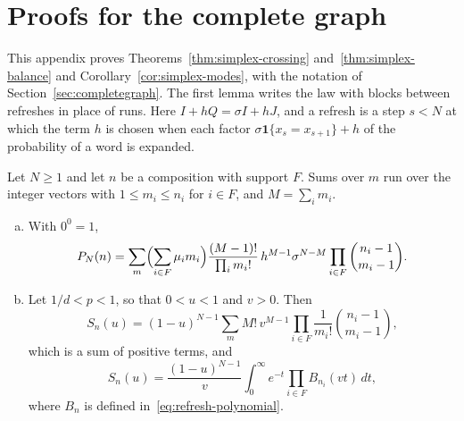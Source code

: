 \section{Proofs for the complete graph}\label{app:complete}

This appendix proves Theorems~\ref{thm:simplex-crossing} and~\ref{thm:simplex-balance} and
Corollary~\ref{cor:simplex-modes}, with the notation of Section~\ref{sec:completegraph}. The
first lemma writes the law with blocks between refreshes in place of runs. Here
$I+hQ=\sigma I+hJ$, and a refresh is a step $s<N$ at which the term $h$ is chosen when each factor
$\sigma\mathbf 1\{x_s=x_{s+1}\}+h$ of the probability of a word is expanded.

\begin{lemma}\label{lem:refresh}
Let $N\ge1$ and let $n$ be a composition with support $F$. Sums over $m$ run over the integer vectors
with $1\le m_i\le n_i$ for $i\in F$, and $M=\sum_im_i$.
\begin{enumerate}[(a)]
\item With $0^0=1$,
\[
P_N(n)=\sum_m\Bigl(\sum_{i\in F}\mu_im_i\Bigr)\frac{(M-1)!}{\prod_im_i!}\,
h^{M-1}\sigma^{N-M}\prod_{i\in F}\binom{n_i-1}{m_i-1}.
\]
\item Let $1/d<p<1$, so that $0<u<1$ and $v>0$. Then
\begin{equation}\label{eq:simplex-positive-sum}
S_n(u)=(1-u)^{N-1}\sum_mM!\,v^{M-1}\prod_{i\in F}\frac1{m_i!}\binom{n_i-1}{m_i-1},
\end{equation}
which is a sum of positive terms, and
\begin{equation}\label{eq:simplex-balance-integral}
S_n(u)=\frac{(1-u)^{N-1}}{v}\int_0^\infty e^{-t}\prod_{i\in F}B_{n_i}(vt)\,dt,
\end{equation}
where $B_n$ is defined in~\eqref{eq:refresh-polynomial}.
\end{enumerate}
\end{lemma}

